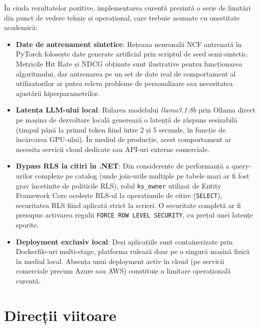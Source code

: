 În ciuda rezultatelor pozitive, implementarea curentă prezintă o serie de limitări din punct de vedere tehnic și operațional, care trebuie asumate cu onestitate academică:
\begin{itemize}
    \item \textbf{Date de antrenament sintetice}: Rețeaua neuronală NCF antrenată în PyTorch folosește date generate artificial prin scriptul de seed semi-sintetic. Metricile Hit Rate și NDCG obținute sunt ilustrative pentru funcționarea algoritmului, dar antrenarea pe un set de date real de comportament al utilizatorilor ar putea releva probleme de personalizare sau necesitatea ajustării hiperparametrilor.
    \item \textbf{Latența LLM-ului local}: Rularea modelului \textit{llama3.1:8b} prin Ollama direct pe mașina de dezvoltare locală generează o latență de răspuns sesizabilă (timpul până la primul token fiind între 2 și 5 secunde, în funcție de încărcarea GPU-ului). În mediul de producție, acest comportament ar necesita servicii cloud dedicate sau API-uri externe comerciale.
    \item \textbf{Bypass RLS la citiri în .NET}: Din considerente de performanță a query-urilor complexe pe catalog (unde join-urile multiple pe tabele mari ar fi fost grav încetinite de politicile RLS), rolul \texttt{ks\_owner} utilizat de Entity Framework Core ocolește RLS-ul la operațiunile de citire (\texttt{SELECT}), securitatea RLS fiind aplicată strict la scrieri. O securitate completă ar fi presupus activarea regulii \texttt{FORCE ROW LEVEL SECURITY}, cu prețul unei latențe sporite.
    \item \textbf{Deployment exclusiv local}: Deși aplicațiile sunt containerizate prin Dockerfile-uri multi-stage, platforma rulează doar pe o singură mașină fizică în mediul local. Absența unui deployment activ în cloud (pe servicii comerciale precum Azure sau AWS) constituie o limitare operațională curentă.
\end{itemize}

\section{Direcții viitoare}

